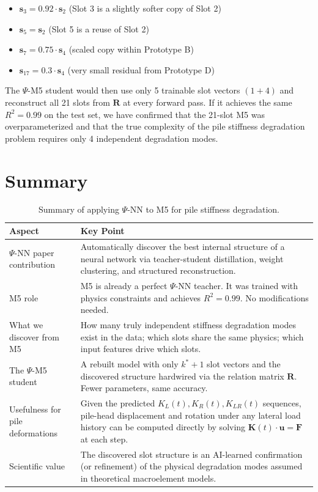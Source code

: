 \documentclass[11pt,a4paper]{article}
\begin{document}
\begin{itemize}[nosep]
    \item $\mathbf{s}_3 = 0.92 \cdot \mathbf{s}_2$ \quad (Slot 3 is a slightly softer copy of Slot 2)
    \item $\mathbf{s}_5 = \mathbf{s}_2$ \quad (Slot 5 is a reuse of Slot 2)
    \item $\mathbf{s}_7 = 0.75 \cdot \mathbf{s}_4$ \quad (scaled copy within Prototype B)
    \item $\mathbf{s}_{17} = 0.3 \cdot \mathbf{s}_4$ \quad (very small residual from Prototype D)
\end{itemize}

The $\Psi$-M5 student would then use only 5 trainable slot vectors $(1 + 4)$ and reconstruct all 21 slots from $\mathbf{R}$ at every forward pass. If it achieves the same $R^2 = 0.99$ on the test set, we have confirmed that the 21-slot M5 was overparameterized and that the true complexity of the pile stiffness degradation problem requires only 4 independent degradation modes.

\section{Summary}

\begin{table}[H]
\centering
\begin{tabularx}{\textwidth}{@{}lX@{}}
\toprule
\textbf{Aspect} & \textbf{Key Point} \\
\midrule
$\Psi$-NN paper contribution & Automatically discover the best internal structure of a neural network via teacher-student distillation, weight clustering, and structured reconstruction. \\
\addlinespace
M5 role & M5 is already a perfect $\Psi$-NN teacher. It was trained with physics constraints and achieves $R^2 = 0.99$. No modifications needed. \\
\addlinespace
What we discover from M5 & How many truly independent stiffness degradation modes exist in the data; which slots share the same physics; which input features drive which slots. \\
\addlinespace
The $\Psi$-M5 student & A rebuilt model with only $k^*+1$ slot vectors and the discovered structure hardwired via the relation matrix $\mathbf{R}$. Fewer parameters, same accuracy. \\
\addlinespace
Usefulness for pile deformations & Given the predicted $K_L(t), K_R(t), K_{LR}(t)$ sequences, pile-head displacement and rotation under any lateral load history can be computed directly by solving $\mathbf{K}(t) \cdot \mathbf{u} = \mathbf{F}$ at each step. \\
\addlinespace
Scientific value & The discovered slot structure is an AI-learned confirmation (or refinement) of the physical degradation modes assumed in theoretical macroelement models. \\
\bottomrule
\end{tabularx}
\caption{Summary of applying $\Psi$-NN to M5 for pile stiffness degradation.}
\end{table}
\end{document}
